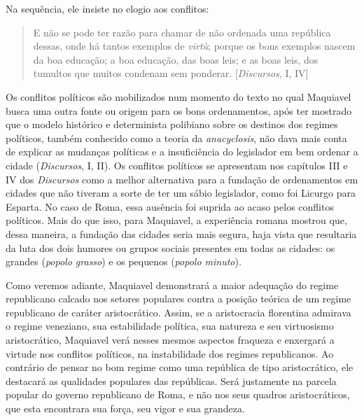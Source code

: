 Na sequência, ele insiste no elogio aos conflitos:

\begin{quote}
E não se pode ter razão para chamar de não ordenada uma república
dessas, onde há tantos exemplos de \emph{virtù}; porque os bons exemplos
nascem da boa educação; a boa educação, das boas leis; e as boas leis,
dos tumultos que muitos condenam sem ponderar. {[}\emph{Discursos}, I,
IV{]}
\end{quote}

Os conflitos políticos são mobilizados num momento do texto no qual
Maquiavel busca uma outra fonte ou origem para os bons ordenamentos,
após ter mostrado que o modelo histórico e determinista polibiano sobre
os destinos dos regimes políticos, também conhecido como a teoria da
\emph{anacyclosis}, não dava mais conta de explicar as mudanças
políticas e a insuficiência do legislador em bem ordenar a cidade
(\emph{Discursos}, I, II). Os conflitos políticos se apresentam nos
capítulos III e IV dos \emph{Discursos} como a melhor alternativa para a
fundação de ordenamentos em cidades que não tiveram a sorte de ter um
sábio legislador, como foi Licurgo para Esparta. No caso de Roma, essa
ausência foi suprida ao acaso pelos conflitos políticos. Mais do que
isso, para Maquiavel, a experiência romana mostrou que, dessa maneira, a
fundação das cidades seria mais segura, haja vista que resultaria da
luta dos dois humores ou grupos sociais presentes em todas as cidades:
os grandes (\emph{popolo grasso}) e os pequenos (\emph{popolo minuto}).

Como veremos adiante, Maquiavel demonstrará a maior adequação do regime
republicano calcado nos setores populares contra a posição teórica de um
regime republicano de caráter aristocrático. Assim, se a aristocracia
florentina admirava o regime veneziano, sua estabilidade política, sua
natureza e seu virtuosismo aristocrático, Maquiavel verá nesses mesmos
aspectos fraqueza e enxergará a virtude nos conflitos políticos, na
instabilidade dos regimes republicanos. Ao contrário de pensar no bom
regime como uma república de tipo aristocrático, ele destacará as
qualidades populares das repúblicas. Será justamente na parcela popular
do governo republicano de Roma, e não nos seus quadros aristocráticos,
que esta encontrara sua força, seu vigor e sua grandeza.

